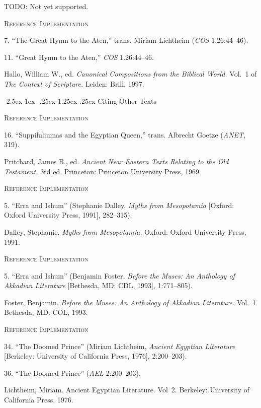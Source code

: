 \documentclass[a4paper]{article}
\makeatletter
\renewcommand\paragraph{\@startsection{paragraph}{4}{\z@}%
            {-2.5ex\@plus -1ex \@minus -.25ex}%
            {1.25ex \@plus .25ex}%
            {\normalfont\normalsize\bfseries}}
\newenvironment{refimp}{%
  \begin{minipage}{\linewidth}
    \setlength{\parskip}{1ex}
    \textsc{Reference Implementation}\par
    \nobreak
    \color{reference-colour}
}{\end{minipage}}
\makeatother
\begin{document}
TODO: Not yet supported.

\begin{refimp}
  7. “The Great Hymn to the Aten,” trans. Miriam Lichtheim (\emph{COS}
  1.26:44–46).

  11. “Great Hymn to the Aten,” \emph{COS} 1.26:44–46.

  \hangindent\bibindent Hallo, William W., ed. \emph{Canonical Compositions
  from the Biblical World.} Vol.~1 of \emph{The Context of Scripture.} Leiden:
  Brill, 1997.
\end{refimp}

\paragraph{Citing Other Texts}

\begin{refimp}
  16. “Suppiluliumas and the Egyptian Queen,” trans. Albrecht Goetze
  (\emph{ANET,} 319).

  \hangindent\bibindent Pritchard, James B., ed. \emph{Ancient Near Eastern
  Texts Relating to the Old Testament.} 3rd ed. Princeton: Princeton
  University Press, 1969.
\end{refimp}

\begin{refimp}
  5. “Erra and Ishum” (Stephanie Dalley, \emph{Myths from Mesopotamia}
  [Oxford: Oxford University Press, 1991], 282–315).
  
  \hangindent\bibindent Dalley, Stephanie. \emph{Myths from Mesopotamia.}
  Oxford: Oxford University Press, 1991.
\end{refimp}

\begin{refimp}
  5. “Erra and Ishum” (Benjamin Foster, \emph{Before the Muses: An Anthology
  of Akkadian Literature} [Bethesda, MD: CDL, 1993], 1:771–805).
  
  \hangindent\bibindent Foster, Benjamin. \emph{Before the Muses: An Anthology of
  Akkadian Literature.} Vol.~1 Bethesda, MD: COL, 1993.
\end{refimp}

\begin{refimp}
  34. “The Doomed Prince” (Miriam Lichtheim, \emph{Ancient Egyptian
  Literature} [Berkeley: University of California Press, 1976], 2:200–203).
  
  36. “The Doomed Prince” (\emph{AEL} 2:200–203).
  
  \hangindent \bibindent Lichtheim, Miriam. Ancient Egyptian Literature.
  Vol~2. Berkeley: University of California Press, 1976.
\end{refimp}
\end{document}
